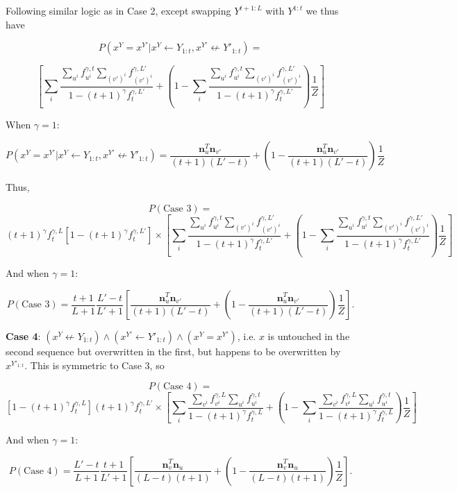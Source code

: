 \documentclass{article}
\begin{document}
\begin{appendices}
Following similar logic as in Case 2, except swapping $Y^{t+1:L}$ with $Y^{1:t}$ we thus have

$$P(x^Y = x^{Y'}|x^Y \leftarrow Y_{1:t}, x^{Y'} \not\leftarrow Y'_{1:t}) =$$

$$\left[
\sum_i \frac{\sum\limits_{u^i} f_{u^i}^{\gamma, t} \sum\limits_{(v')^i} f_{(v')^i}^{\gamma,L'}}{1 - (t+1)^\gamma f^{\gamma,L'}_t} 
+ \left(1 - \sum_i \frac{\sum\limits_{u^i} f_{u^i}^{\gamma, t} \sum\limits_{(v')^i} f_{(v')^i}^{\gamma,L'}}{1 - (t+1)^\gamma f^{\gamma,L'}_t}\right)\frac{1}{Z}
\right]$$

When $\gamma = 1$:

$$P(x^Y = x^{Y'}|x^Y \leftarrow Y_{1:t}, x^{Y'} \not\leftarrow Y'_{1:t}) =
\frac{\mathbf{n}^T_{u}\mathbf{n}_{v'}}{(t+1)(L'-t)} + \left(1 - \frac{\mathbf{n}^T_{u}\mathbf{n}_{v'}}{(t+1)(L'-t)} \right)\frac{1}{Z}$$

Thus,

$$P(\textrm{Case 3}) = $$
$$(t+1)^\gamma f^{\gamma,L}_t[1-(t+1)^\gamma f^{\gamma,L'}_t] \times 
\left[
\sum_i \frac{\sum\limits_{u^i} f_{u^i}^{\gamma, t} \sum\limits_{(v')^i} f_{(v')^i}^{\gamma,L'}}{1 - (t+1)^\gamma f^{\gamma,L'}_t} 
+ \left(1 - \sum_i \frac{\sum\limits_{u^i} f_{u^i}^{\gamma, t} \sum\limits_{(v')^i} f_{(v')^i}^{\gamma,L'}}{1 - (t+1)^\gamma f^{\gamma,L'}_t}\right)\frac{1}{Z}
\right]$$

And when $\gamma = 1$:

$$P(\textrm{Case 3}) = \frac{t+1}{L+1}\frac{L'-t}{L'+1}\left[
\frac{\mathbf{n}^T_{u}\mathbf{n}_{v'}}{(t+1)(L'-t)} + \left(1 - \frac{\mathbf{n}^T_{u}\mathbf{n}_{v'}}{(t+1)(L'-t)} \right)\frac{1}{Z}
\right].$$

\textbf{Case 4}: $(x^Y \not \leftarrow Y_{1:t}) \land (x^{Y'} \leftarrow Y'_{1:t}) \land (x^Y = x^{Y'})$, i.e. $x$ is untouched in the second sequence but overwritten in the first, but happens to be overwritten by $x^{Y'_{1:t}}$. This is symmetric to Case 3, so

$$P(\textrm{Case 4}) = $$
$$[1 - (t+1)^\gamma f^{\gamma,L}_t](t+1)^\gamma f^{\gamma,L'}_t \times \left[
\sum_i \frac{\sum\limits_{v^i} f_{v^i}^{\gamma,L}\sum\limits_{u^i} f_{u^i}^{\gamma, t}}{1 - (t+1)^\gamma f^{\gamma,L}_t} 
+ \left(1 - \sum_i \frac{\sum\limits_{v^i} f_{v^i}^{\gamma,L}\sum\limits_{u^i} f_{u^i}^{\gamma, t}}{1 - (t+1)^\gamma f^{\gamma,L}_t}\right)\frac{1}{Z}
\right]$$

And when $\gamma = 1$:

$$P(\textrm{Case 4}) = \frac{L'-t}{L+1}\frac{t+1}{L'+1}\left[
\frac{\mathbf{n}^T_{v}\mathbf{n}_{u}}{(L-t)(t+1)} + \left(1 - \frac{\mathbf{n}^T_{v}\mathbf{n}_{u}}{(L-t)(t+1)} \right)\frac{1}{Z}
\right].$$


\end{appendices}
\end{document}
